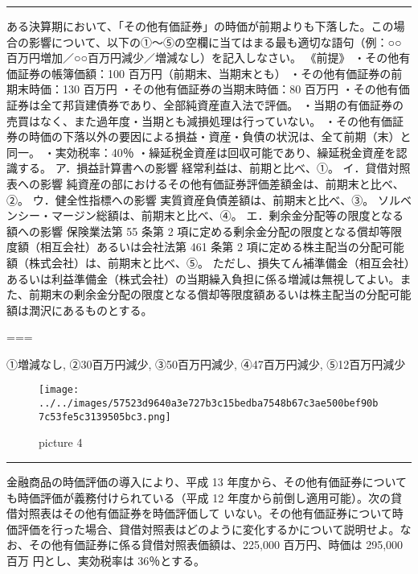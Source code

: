 \documentclass[report,gutter=10mm,fore-edge=10mm,uplatex,dvipdfmx]{jlreq}
\begin{document}
\begin{center}\rule{0.5\linewidth}{0.5pt}\end{center}


ある決算期において、「その他有価証券」の時価が前期よりも下落した。この場合の影響について、以下の①～⑤の空欄に当てはまる最も適切な語句（例：○○百万円増加／○○百万円減少／増減なし）を記入しなさい。
《前提》 ・その他有価証券の帳簿価額：100 百万円（前期末、当期末とも）
・その他有価証券の前期末時価：130 百万円
・その他有価証券の当期末時価：80 百万円
・その他有価証券は全て邦貨建債券であり、全部純資産直入法で評価。
・当期の有価証券の売買はなく、また過年度・当期とも減損処理は行っていない。
・その他有価証券の時価の下落以外の要因による損益・資産・負債の状況は、全て前期（末）と同一。
・実効税率：40％
・繰延税金資産は回収可能であり、繰延税金資産を認識する。
ア．損益計算書への影響 経常利益は、前期と比べ、①。
イ．貸借対照表への影響
純資産の部におけるその他有価証券評価差額金は、前期末と比べ、②。
ウ．健全性指標への影響 実質資産負債差額は、前期末と比べ、③。
ソルベンシー・マージン総額は、前期末と比べ、④。
エ．剰余金分配等の限度となる額への影響 保険業法第 55 条第 2
項に定める剰余金分配の限度となる償却等限度額（相互会社）あるいは会社法第
461 条第 2
項に定める株主配当の分配可能額（株式会社）は、前期末と比べ、⑤。
ただし、損失てん補準備金（相互会社）あるいは利益準備金（株式会社）の当期繰入負担に係る増減は無視してよい。また、前期末の剰余金分配の限度となる償却等限度額あるいは株主配当の分配可能額は潤沢にあるものとする。

===


①増減なし, ②30百万円減少, ③50百万円減少, ④47百万円減少, ⑤12百万円減少

\begin{figure}
\centering
\texttt{[image: ../../images/57523d9640a3e727b3c15bedba7548b67c3ae500bef90b7c53fe5c3139505bc3.png]}
\caption{picture 4}
\end{figure}

\begin{center}\rule{0.5\linewidth}{0.5pt}\end{center}


金融商品の時価評価の導入により、平成 13
年度から、その他有価証券についても時価評価が義務付けられている（平成 12
年度から前倒し適用可能）。次の貸借対照表はその他有価証券を時価評価して
いない。その他有価証券について時価評価を行った場合、貸借対照表はどのように変化するかについて説明せよ。なお、その他有価証券に係る貸借対照表価額は、225,000
百万円、時価は 295,000 百万 円とし、実効税率は 36％とする。
\end{document}
